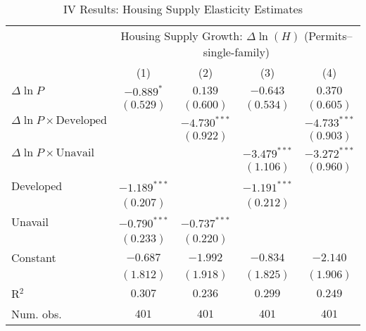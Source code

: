 
\begin{table}
\caption{IV Results: Housing Supply Elasticity Estimates}
\begin{center}
\begin{footnotesize}
\begin{threeparttable}
\begin{tabular}{l c c c c}
\toprule
 & \multicolumn{4}{c}{Housing Supply Growth: $\Delta\ln(H)$ (Permits--single-family)} \\
\cmidrule(lr){2-5}
 & (1) & (2) & (3) & (4) \\
\midrule
$\Delta\ln P$                         & $-0.889^{*}$   & $0.139$        & $-0.643$       & $0.370$        \\
                                      & $(0.529)$      & $(0.600)$      & $(0.534)$      & $(0.605)$      \\
$\Delta\ln P\times{\text{Developed}}$ &                & $-4.730^{***}$ &                & $-4.733^{***}$ \\
                                      &                & $(0.922)$      &                & $(0.903)$      \\
$\Delta\ln P\times{\text{Unavail}}$   &                &                & $-3.479^{***}$ & $-3.272^{***}$ \\
                                      &                &                & $(1.106)$      & $(0.960)$      \\
Developed                             & $-1.189^{***}$ &                & $-1.191^{***}$ &                \\
                                      & $(0.207)$      &                & $(0.212)$      &                \\
Unavail                               & $-0.790^{***}$ & $-0.737^{***}$ &                &                \\
                                      & $(0.233)$      & $(0.220)$      &                &                \\
Constant                              & $-0.687$       & $-1.992$       & $-0.834$       & $-2.140$       \\
                                      & $(1.812)$      & $(1.918)$      & $(1.825)$      & $(1.906)$      \\
\midrule
R$^2$                                 & $0.307$        & $0.236$        & $0.299$        & $0.249$        \\
Num. obs.                             & $401$          & $401$          & $401$          & $401$          \\

\end{tabular}
\end{threeparttable}
\end{footnotesize}
\end{center}
\end{table}
